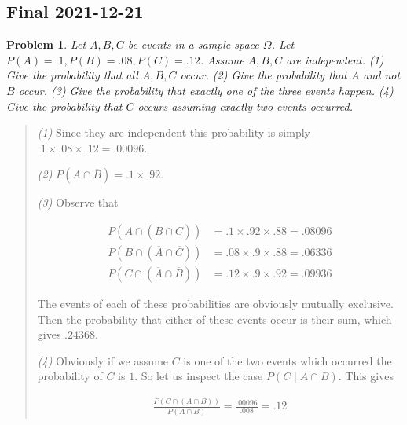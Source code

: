 \documentclass[a4paper, 12pt]{article}
\newtheorem{problem}{Problem}
\newtheorem{problem}{Problem}
\begin{document}
\pagebreak 

\subsection{Final 2021-12-21}

\begin{problem}
    Let $A, B, C$ be events in a sample space $\Omega$. Let $P(A) = .1, P(B) =
    .08, P(C) = .12$. Assume $A, B, C$ are independent. \textit{(1)} Give the
    probability that all $A, B, C$ occur. \textit{(2)} Give the probability that
    $A$ and not $B$ occur. \textit{(3)} Give the probability that exactly one of
    the three events happen. \textit{(4)} Give the probability that $C$ occurs
    assuming exactly two events occurred.
\end{problem}


\small
\begin{quote}

\textit{(1)} Since they are independent this probability is simply $.1 \times
.08 \times .12 = .00096$.

\textit{(2)} $P(A \cap \overline{B}) = .1 \times .92$.

\textit{(3)} Observe that

\begin{align*}
    P\left(A \cap (\overline{B} \cap \overline{C})\right) &= .1 \times .92
    \times . 88 = .08096\\
    P\left(B \cap (\overline{A} \cap \overline{C})\right) &= .08 \times .9
    \times . 88 = .06336\\
    P\left(C \cap (\overline{A} \cap \overline{B})\right) &= .12 \times .9
    \times .92 = .09936
\end{align*}

The events of each of these probabilities are obviously mutually exclusive. Then
the probability that either of these events occur is their sum, which gives
$.24368$.

\textit{(4)} Obviously if we assume $C$ is one of the two events which occurred
the probability of $C$ is $1$. So let us inspect the case $P(C \mid A \cap
B)$. This gives 

\begin{align*}
    \frac{P \left( C \cap (A \cap B) \right) }{P(A \cap B)} =
    \frac{.00096}{.008} = .12
\end{align*}

\end{quote}
\normalsize

\pagebreak 
\end{document}
